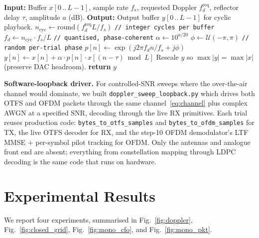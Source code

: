 \documentclass[conference,10pt]{IEEEtran}
\newcommand{\fd}{f_d}
\begin{document}
\begin{algorithm}[t]
\caption{Cyclic-coherent Doppler injection on an IQ file.}
\label{alg:doppler}
\begin{algorithmic}[1]
\STATE \textbf{Input:} Buffer $x[0\,..\,L{-}1]$, sample rate $f_s$, requested Doppler $\fd^{\mathrm{req}}$, reflector delay $\tau$, amplitude $a$ (dB).
\STATE \textbf{Output:} Output buffer $y[0\,..\,L{-}1]$ for cyclic playback.
\STATE $n_{\mathrm{cyc}} \leftarrow \mathrm{round}(\fd^{\mathrm{req}} L / f_s)$  \quad \texttt{// integer cycles per buffer}
\STATE $\fd \leftarrow n_{\mathrm{cyc}} \cdot f_s / L$  \quad \texttt{// quantised, phase-coherent}
\STATE $\alpha \leftarrow 10^{a/20}$
\STATE $\phi \leftarrow \mathcal{U}(-\pi, \pi)$  \quad \texttt{// random per-trial phase}
  \STATE $p[n] \leftarrow \exp(j 2\pi \fd n / f_s + j\phi)$
\ENDFOR
\STATE $y[n] \leftarrow x[n] + \alpha \cdot p[n] \cdot x[(n{-}\tau) \bmod L]$
\STATE Rescale $y$ so $\max |y| = \max |x|$ (preserve DAC headroom).
\STATE \textbf{return} $y$
\end{algorithmic}
\end{algorithm}

\textbf{Software-loopback driver.} For controlled-SNR sweeps where the over-the-air channel would dominate, we built \texttt{doppler\_sweep\_loopback.py} which drives both OTFS and OFDM packets through the same channel~\eqref{eq:channel} plus complex AWGN at a specified SNR, decoding through the live RX primitives. Each trial reuses production code: \texttt{bytes\_to\_otfs\_samples} and \texttt{bytes\_to\_ofdm\_samples} for TX, the live OTFS decoder for RX, and the step-10 OFDM demodulator's LTF MMSE + per-symbol pilot tracking for OFDM. Only the antennas and analogue front end are absent; everything from constellation mapping through LDPC decoding is the same code that runs on hardware.

\section{Experimental Results}
\label{sec:results}

We report four experiments, summarised in Fig.~\ref{fig:doppler}, Fig.~\ref{fig:closed_grid}, Fig.~\ref{fig:mono_cfo}, and Fig.~\ref{fig:mono_pkt}.

\end{document}
